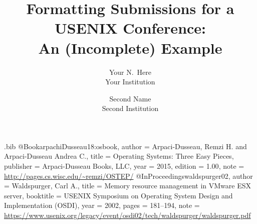 \usepackage{fillin}

\usepackage{filecontents}

\begin{filecontents}{\jobname.bib}
@Book{arpachiDusseau18:osbook,
  author =       {Arpaci-Dusseau, Remzi H. and Arpaci-Dusseau Andrea C.},
  title =        {Operating Systems: Three Easy Pieces},
  publisher =    {Arpaci-Dusseau Books, LLC},
  year =         2015,
  edition =      {1.00},
  note =         {\url{http://pages.cs.wisc.edu/~remzi/OSTEP/}}
}
@InProceedings{waldspurger02,
  author =       {Waldspurger, Carl A.},
  title =        {Memory resource management in {VMware ESX} server},
  booktitle =    {USENIX Symposium on Operating System Design and
                  Implementation (OSDI)},
  year =         2002,
  pages =        {181--194},
  note =         {\url{https://www.usenix.org/legacy/event/osdi02/tech/waldspurger/waldspurger.pdf}}}
\end{filecontents}



\date{}

\title{\Large \bf Formatting Submissions for a USENIX Conference:\\
  An (Incomplete) Example}

\author{
{\rm Your N.\ Here}\\
Your Institution
\and
{\rm Second Name}\\
Second Institution
} %

\maketitle

